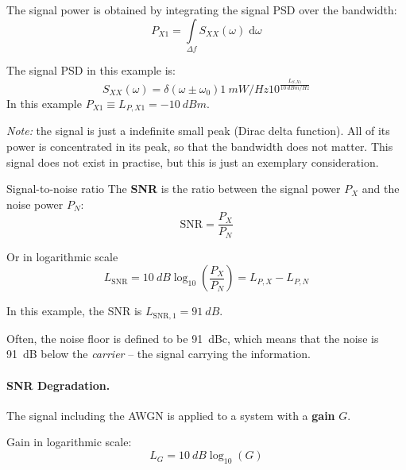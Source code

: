 \begin{refsection}
The signal power is obtained by integrating the signal \ac{PSD} over the bandwidth:
\begin{equation}
	P_{X1} = \int\limits_{\Delta f} S_{XX}(\omega) \; \mathrm{d} \omega
\end{equation}

The signal \ac{PSD} in this example is:
\begin{equation*}
	S_{XX}(\omega) = \delta(\omega \pm \omega_0) \SI{1}{mW/Hz} 10^{\frac{L_{S,X1}}{\SI{10}{dBm/Hz}}}
\end{equation*}
In this example $P_{X1} \equiv L_{P,X1} = \SI{-10}{dBm}$.

\textit{Note:} the signal is just a indefinite small peak (Dirac delta function). All of its power is concentrated in its peak, so that the bandwidth does not matter. This signal does not exist in practise, but this is just an exemplary consideration.

\begin{definition}{Signal-to-noise ratio}
	The  \textbf{\ac{SNR}} is the ratio between the signal power $P_{X}$ and the noise power $P_{N}$:
	\begin{equation}
		\mathrm{SNR} = \frac{P_{X}}{P_{N}}
	\end{equation}%
	
	Or in logarithmic scale
	\begin{equation}
		L_{\mathrm{SNR}} = \SI{10}{dB} \log_{10} \left(\frac{P_{X}}{P_{N}}\right) = L_{P,X} - L_{P,N}
	\end{equation}
\end{definition}

In this example, the \ac{SNR} is $L_{\mathrm{SNR},1} = \SI{91}{dB}$.

Often, the noise floor is defined to be \SI{91}{dBc}, which means that the noise is \SI{91}{dB} below the  \emph{carrier} -- the signal carrying the information.

\paragraph{\ac{SNR} Degradation.}

The signal including the \ac{AWGN} is applied to a system with a  \textbf{gain} $G$.

Gain in logarithmic scale:
\begin{equation}
	L_G = \SI{10}{dB} \log_{10} \left(G\right)
\end{equation}


\end{refsection}
